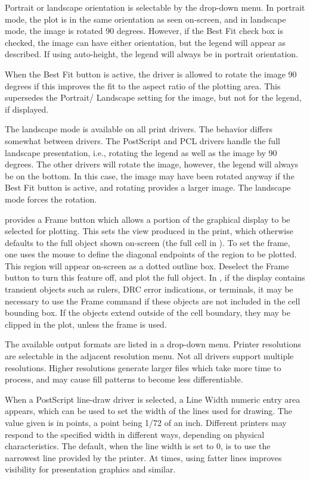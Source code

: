 Portrait or landscape orientation is selectable by the drop-down menu. 
In portrait mode, the plot is in the same orientation as seen
on-screen, and in landscape mode, the image is rotated 90 degrees. 
However, if the {\cb Best Fit} check box is checked, the image can
have either orientation, but the legend will appear as described.  If
using auto-height, the legend will always be in portrait orientation.

When the {\cb Best Fit} button is active, the driver is allowed to
rotate the image 90 degrees if this improves the fit to the aspect
ratio of the plotting area.  This supersedes the {\cb Portrait}/{\cb
Landscape} setting for the image, but not for the legend, if
displayed.

The landscape mode is available on all print drivers.  The behavior
differs somewhat between drivers.  The PostScript and PCL drivers
handle the full landscape presentation, i.e., rotating the legend as
well as the image by 90 degrees.  The other drivers will rotate the
image, however, the legend will always be on the bottom.  In this
case, the image may have been rotated anyway if the {\cb Best Fit}
button is active, and rotating provides a larger image.  The landscape
mode forces the rotation.

{\Xic} provides a {\cb Frame} button which allows a portion of the
graphical display to be selected for plotting.  This sets the view
produced in the print, which otherwise defaults to the full object
shown on-screen (the full cell in {\Xic}).  To set the frame, one uses
the mouse to define the diagonal endpoints of the region to be
plotted.  This region will appear on-screen as a dotted outline box. 
Deselect the {\cb Frame} button to turn this feature off, and plot the
full object.  In {\Xic}, if the display contains transient objects
such as rulers, DRC error indications, or terminals, it may be
necessary to use the {\cb Frame} command if these objects are not
included in the cell bounding box.  If the objects extend outside of
the cell boundary, they may be clipped in the plot, unless the frame
is used.

The available output formats are listed in a drop-down menu.  Printer
resolutions are selectable in the adjacent resolution menu.  Not all
drivers support multiple resolutions.  Higher resolutions generate
larger files which take more time to process, and may cause fill
patterns to become less differentiable.

When a PostScript line-draw driver is selected, a {\cb Line Width}
numeric entry area appears, which can be used to set the width of the
lines used for drawing.  The value given is in points, a point being
1/72 of an inch.  Different printers may respond to the specified
width in different ways, depending on physical characteristics.  The
default, when the line width is set to 0, is to use the narrowest line
provided by the printer.  At times, using fatter lines improves
visibility for presentation graphics and similar.

